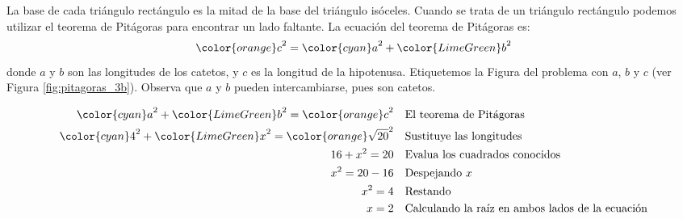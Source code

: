 \begin{solutionbox}{15cm}
\begin{minipage}{0.65\textwidth}
        La base de cada triángulo rectángulo es la mitad de la base del triángulo isóceles.
        Cuando se trata de un triángulo rectángulo podemos utilizar el teorema de Pitágoras para encontrar un lado faltante.
        La ecuación del teorema de Pitágoras es:
        \[{\color{orange}c}^2={\color{cyan}a}^2+{\color{LimeGreen}b}^2\]
        donde $a$ y $b$ son las longitudes de los catetos, y $c$ es la longitud de la hipotenusa.
        Etiquetemos la Figura del problema con $a$, $b$ y $c$ (ver Figura \ref{fig:pitagoras_3b}).
        Observa que $a$ y $b$ pueden intercambiarse, pues son catetos.
    \end{minipage}
    \begin{align*}
        {\color{cyan}a}^2+{\color{LimeGreen}b}^2  ={\color{orange}c}^2         & \text{\quad El teorema de Pitágoras}                          \\
        {\color{cyan}4}^2+{\color{LimeGreen}x}^2  ={\color{orange}\sqrt{20}}^2 & \text{\quad Sustituye las longitudes}                         \\
        16+x^2  =20                                                            & \text{\quad Evalua los cuadrados conocidos}                   \\
        x^2=20-16                                                              & \text{\quad Despejando } x                                    \\
        x^2=4                                                                  & \text{\quad Restando}                                         \\
        x=2                                                                    & \text{\quad Calculando la raíz en ambos lados de la ecuación} \\
    \end{align*}
\end{solutionbox}
